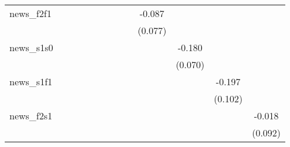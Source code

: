 {\begin{tabular}{l*{12}{c}}
\addlinespace
news\_f2f1   &                     &                     &                     &                     &                     &                     &                     &                     &      -0.087         &                     &                     &                     \\
            &                     &                     &                     &                     &                     &                     &                     &                     &     (0.077)         &                     &                     &                     \\
\addlinespace
news\_s1s0   &                     &                     &                     &                     &                     &                     &                     &                     &                     &      -0.180\sym{**} &                     &                     \\
            &                     &                     &                     &                     &                     &                     &                     &                     &                     &     (0.070)         &                     &                     \\
\addlinespace
news\_s1f1   &                     &                     &                     &                     &                     &                     &                     &                     &                     &                     &      -0.197\sym{*}  &                     \\
            &                     &                     &                     &                     &                     &                     &                     &                     &                     &                     &     (0.102)         &                     \\
\addlinespace
news\_f2s1   &                     &                     &                     &                     &                     &                     &                     &                     &                     &                     &                     &      -0.018         \\
            &                     &                     &                     &                     &                     &                     &                     &                     &                     &                     &                     &     (0.092)         \\

\end{tabular}}
